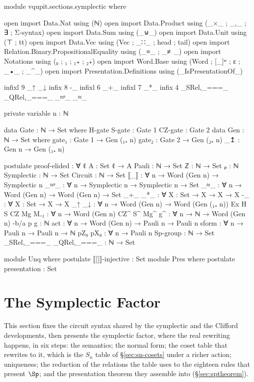 \begin{code}[hide]
module vqupit.sections.symplectic where

open import Data.Nat using (ℕ)
open import Data.Product using (_×_ ; _,_ ; ∃ ; Σ-syntax)
open import Data.Sum using (_⊎_)
open import Data.Unit using (⊤ ; tt)
open import Data.Vec using (Vec ; _∷_ ; head ; tail)
open import Relation.Binary.PropositionalEquality using (_≡_ ; _≢_)
open import Notations using (₀ ; ₁ ; ₁₊ ; ₂₊)
open import Word.Base using (Word ; [_]ʷ ; ε ; _•_ ; _^_)
open import Presentation.Definitions using (_IsPresentationOf_)

infixl 9 _↑ _↓
infix 8 -_
infixl 6 _+_
infixl 7 _*_
infix 4 _SRel,_===_ _QRel,_===_ _≈ˢ_ _≈_

private variable
  n : ℕ

data Gate : ℕ → Set where
  H-gate S-gate : Gate 1
  CZ-gate : Gate 2
data Gen : ℕ → Set where
  gate₁ : Gate 1 → Gen (₁₊ n)
  gate₂ : Gate 2 → Gen (₂₊ n)
  _↥   : Gen n → Gen (₁₊ n)

postulate
  proof-elided : ∀ {ℓ} {A : Set ℓ} → A
  Pauli : ℕ → Set
  ℤ : ℕ → Set
  ₚ : ℕ
  Symplectic : ℕ → Set
  Circuit : ℕ → Set
  ⟦_⟧ : ∀ {n} → Word (Gen n) → Symplectic n
  _≈ˢ_ : ∀ {n} → Symplectic n → Symplectic n → Set
  _≈_ : ∀ {n} → Word (Gen n) → Word (Gen n) → Set
  _+_ _*_ : ∀ {X : Set} → X → X → X
  -_ : ∀ {X : Set} → X → X
  _↑ _↓ : ∀ {n} → Word (Gen n) → Word (Gen (₁₊ n))
  Ex H S CZ Mg M₋₁ : ∀ {n} → Word (Gen n)
  CZ^ S^ Mg^ g^ : ∀ {n} → ℕ → Word (Gen n)
  -b/a p g : ℕ
  act : ∀ {n} → Word (Gen n) → Pauli n → Pauli n
  sform : ∀ {n} → Pauli n → Pauli n → ℕ
  pZ₀ pX₀ : ∀ {n} → Pauli n
  Sp-group : ℕ → Set
  _SRel,_===_ _QRel,_===_ : ℕ → Set

module Unq where
  postulate ⟦[]⟧-injective : Set
module Pres where
  postulate presentation : Set
\end{code}
\section{The Symplectic Factor}\label{sec:symplectic}

This section fixes the circuit syntax shared by the symplectic and the
Clifford developments, then presents the symplectic factor, where the
real rewriting happens, in six steps: the semantics; the normal form;
the coset table that rewrites to it, which is the $S_n$ table of
\S\ref{sec:sn-cosets} under a richer action; uniqueness; the reduction
of the relations the table uses to the eighteen rules that present
$\Sp$; and the presentation theorem they assemble into
(\S\ref{sec:sptheorem}).


